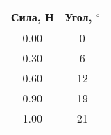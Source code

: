 \begin{tabular}{|c|c|}
\hline
Сила, Н & Угол, $^\circ$ \\ \hline
0.00 & 0 \\ \hline
0.30 & 6 \\ \hline
0.60 & 12 \\ \hline
0.90 & 19 \\ \hline
1.00 & 21 \\ \hline
\end{tabular}
